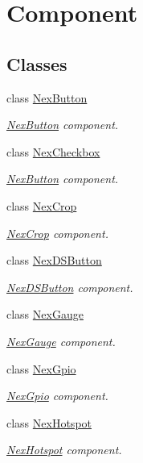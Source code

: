 \hypertarget{group___component}{}\section{Component}
\label{group___component}
\subsection*{Classes}
\begin{DoxyCompactItemize}
\item 
class \hyperlink{class_nex_button}{Nex\+Button}
\begin{DoxyCompactList}\small\item\em \hyperlink{class_nex_button}{Nex\+Button} component. \end{DoxyCompactList}\item 
class \hyperlink{class_nex_checkbox}{Nex\+Checkbox}
\begin{DoxyCompactList}\small\item\em \hyperlink{class_nex_button}{Nex\+Button} component. \end{DoxyCompactList}\item 
class \hyperlink{class_nex_crop}{Nex\+Crop}
\begin{DoxyCompactList}\small\item\em \hyperlink{class_nex_crop}{Nex\+Crop} component. \end{DoxyCompactList}\item 
class \hyperlink{class_nex_d_s_button}{Nex\+D\+S\+Button}
\begin{DoxyCompactList}\small\item\em \hyperlink{class_nex_d_s_button}{Nex\+D\+S\+Button} component. \end{DoxyCompactList}\item 
class \hyperlink{class_nex_gauge}{Nex\+Gauge}
\begin{DoxyCompactList}\small\item\em \hyperlink{class_nex_gauge}{Nex\+Gauge} component. \end{DoxyCompactList}\item 
class \hyperlink{class_nex_gpio}{Nex\+Gpio}
\begin{DoxyCompactList}\small\item\em \hyperlink{class_nex_gpio}{Nex\+Gpio} component. \end{DoxyCompactList}\item 
class \hyperlink{class_nex_hotspot}{Nex\+Hotspot}
\begin{DoxyCompactList}\small\item\em \hyperlink{class_nex_hotspot}{Nex\+Hotspot} component. \end{DoxyCompactList}\item 

\end{DoxyCompactItemize}
